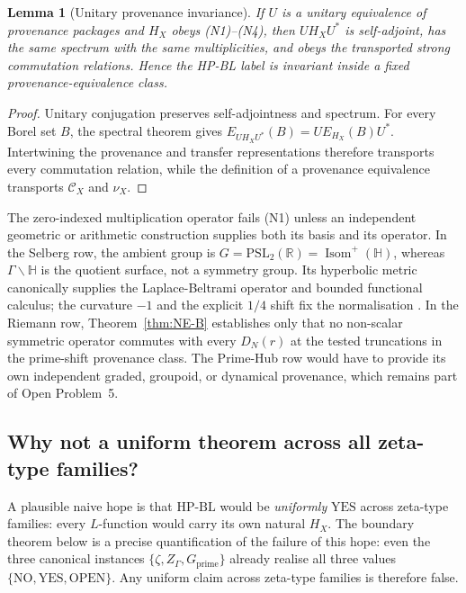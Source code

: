\documentclass[11pt]{article}
\newtheorem{lemma}[theorem]{Lemma}
\theoremstyle{definition}
\theoremstyle{remark}
\newcommand{\HBL}{\mathrm{HP\text{-}BL}}
\newcommand{\PSL}{\mathrm{PSL}}
\begin{document}
\begin{lemma}[Unitary provenance invariance]\label{lem:hp3-unitary}
If $U$ is a unitary equivalence of provenance packages and $H_X$ obeys
(N1)--(N4), then $UH_XU^*$ is self-adjoint, has the same spectrum with
the same multiplicities, and obeys the transported strong commutation
relations. Hence the HP-BL label is invariant inside a fixed
provenance-equivalence class.
\end{lemma}

\begin{proof}
Unitary conjugation preserves self-adjointness and spectrum. For every
Borel set $B$, the spectral theorem gives
$E_{UH_XU^*}(B)=U E_{H_X}(B)U^*$. Intertwining the provenance and
transfer representations therefore transports every commutation
relation, while the definition of a provenance equivalence transports
$\mathcal{C}_X$ and $\nu_X$.
\end{proof}

The zero-indexed multiplication operator fails (N1) unless an
independent geometric or arithmetic construction supplies both its
basis and its operator. In the Selberg row, the ambient group is
$G=\PSL_2(\mathbb{R})=\operatorname{Isom}^+(\mathbb{H})$, whereas
$\Gamma\backslash\mathbb{H}$ is the quotient surface, not a symmetry
group. Its hyperbolic metric canonically supplies the Laplace-Beltrami
operator and bounded functional calculus; the curvature $-1$ and the
explicit $1/4$ shift fix the normalisation
\cite{Selberg1956,Marklof2008}. In the Riemann row,
Theorem~\ref{thm:NE-B} establishes only that no non-scalar symmetric
operator commutes with every $D_N(r)$ at the tested truncations in the
prime-shift provenance class. The Prime-Hub row would have to provide
its own independent graded, groupoid, or dynamical provenance, which
remains part of Open Problem~5.

\subsection{Why not a uniform theorem across all zeta-type families?}

A plausible naive hope is that $\HBL$ would be \emph{uniformly}
$\mathrm{YES}$ across zeta-type families: every $L$-function would
carry its own natural $H_X$. The boundary theorem below is a precise
quantification of the failure of this hope: even the three canonical
instances $\{\zeta, Z_\Gamma, G_\mathrm{prime}\}$ already realise all
three values $\{\mathrm{NO}, \mathrm{YES}, \mathrm{OPEN}\}$. Any
uniform claim across zeta-type families is therefore false.
\end{document}
